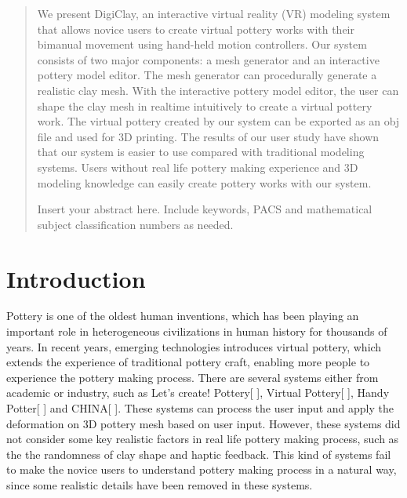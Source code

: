 \date{Received: date / Accepted: date}


\maketitle

\begin{abstract}
We present DigiClay, an interactive virtual reality (VR) modeling system that allows novice users to create virtual pottery works with their bimanual movement using hand-held motion controllers.
Our system consists of two major components: a mesh generator and an interactive pottery model editor.
The mesh generator can procedurally generate a realistic clay mesh. With the interactive pottery model editor, the user can shape the clay mesh in realtime intuitively to create a virtual pottery work.
The virtual pottery created by our system can be exported as an obj file and used for 3D printing.
The results of our user study have shown that our system is easier to use compared with traditional modeling systems. Users without real life pottery making experience and 3D modeling knowledge can easily create pottery works with our system.


Insert your abstract here. Include keywords, PACS and mathematical
subject classification numbers as needed.
\end{abstract}

\section{Introduction}
\label{intro}

Pottery is one of the oldest human inventions, which has been playing an important role in heterogeneous civilizations in human history for thousands of years.
In recent years, emerging technologies introduces virtual pottery, which extends the experience of traditional pottery craft, enabling more people to experience the pottery making process.
There are several systems either from academic or industry, such as Let’s create! Pottery[ ], Virtual Pottery[ ], Handy Potter[ ] and CHINA[ ].
These systems can process the user input and apply the deformation on 3D pottery mesh based on user input.
However, these systems did not consider some key realistic factors in real life pottery making process, such as the the randomness of clay shape and haptic feedback.
This kind of systems fail to make the novice users to understand pottery making process in a natural way, since some realistic details have been removed in these systems.

